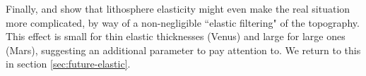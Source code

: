 

Finally, \citet{Zhong2002} and \citet{Golle2012} show that lithosphere elasticity might even make the real situation more complicated, by way of a non-negligible ``elastic filtering" of the topography. This effect is small for thin elastic thicknesses (Venus) and large for large ones (Mars), suggesting an additional parameter to pay attention to. We return to this in section \ref{sec:future-elastic}.















